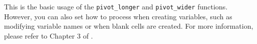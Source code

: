 \documentclass{ltjsbook}
\begin{document}
This is the basic usage of the \verb|pivot_longer| and \verb|pivot_wider| functions. However, you can also set how to process when creating variables, such as modifying variable names or when blank cells are created. For more information, please refer to Chapter 3 of \textcite{Kinosady2021}.
\end{document}
